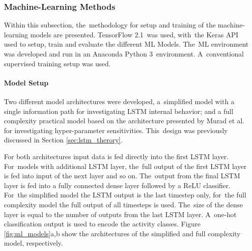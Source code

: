 \subsubsection{Machine-Learning Methods}
\label{sec:machine_Learning}
Within this subsection, the~methodology for setup and training of the machine-learning models are presented. TensorFlow 2.1~was used, with~the Keras API used to setup, train and evaluate the different ML Models. The~ML environment was developed and run in an Anaconda Python 3~environment. A~conventional supervised training setup was used.

\paragraph{Model Setup}
\label{subsubsec:model_setup}
Two different model architectures were developed, a~simplified model with a single information path for investigating LSTM internal behavior; and a full complexity practical model based on the architecture presented by Murad et al.~\cite{Murad2017} for investigating hyper-parameter sensitivities. This~design was previously discussed in Section \ref{sec:lstm_therory}.

For both architectures input data is fed directly into the first LSTM layer. For~models with additional LSTM layer, the~full output of the first LSTM layer is fed into input of the next layer and so on. The~output from the final LSTM layer is fed into a fully connected dense layer followed by a ReLU classifier. For~the simplified model the LSTM output is the last timestep only, for~the full complexity model the full output of all timesteps is used. The~size of the dense layer is equal to the number of outputs from the last LSTM layer. A~one-hot classification output is used to encode the activity classes. Figure  \ref{fig:ml_models}a,b show the architectures of the simplified and full complexity model, respectively.


